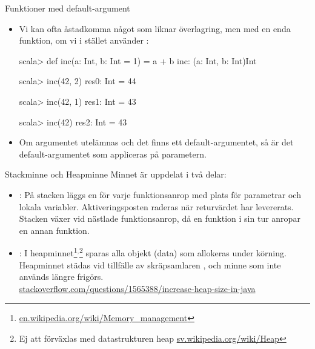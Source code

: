\begin{Slide}{Funktioner med default-argument}\SlideFontSmall

\begin{itemize}
\item Vi kan ofta åstadkomma något som liknar överlagring, men med en enda funktion, om vi i stället använder :
\begin{REPLnonum}
scala> def inc(a: Int, b: Int = 1) = a + b
inc: (a: Int, b: Int)Int

scala> inc(42, 2)
res0: Int = 44

scala> inc(42, 1)
res1: Int = 43

scala> inc(42)
res2: Int = 43

\end{REPLnonum}
\item Om argumentet utelämnas och det finns ett default-argumentet, så är det default-argumentet som appliceras på parametern.
\end{itemize}
\end{Slide} 


\begin{Slide}{Stackminne och Heapminne}\SlideFontSmall
Minnet är uppdelat i två delar:
\begin{itemize}
\item {}: På stacken läggs en   för varje funktionsanrop med plats för parametrar och lokala variabler. Aktiveringsposten raderas när returvärdet har levererats. Stacken växer vid nästlade funktionsanrop, då en funktion i sin tur anropar en annan funktion. 

\item {}: I heapminnet\footnote{\href{https://en.wikipedia.org/wiki/Memory_management}{en.wikipedia.org/wiki/Memory\_management}}$^{,}$\footnote{Ej att förväxlas med datastrukturen heap  \href{https://sv.wikipedia.org/wiki/Heap}{sv.wikipedia.org/wiki/Heap}} sparas alla objekt (data) som allokeras under körning. Heapminnet städas vid tillfälle av skräpsamlaren , och minne som inte används längre frigörs. \\\vspace{0.5em}
\href{http://stackoverflow.com/questions/1565388/increase-heap-size-in-java}{stackoverflow.com/questions/1565388/increase-heap-size-in-java}
\end{itemize}
\end{Slide} 


